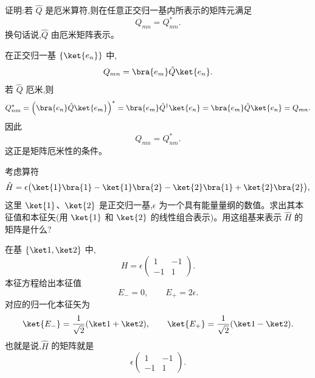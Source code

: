 \begin{question}
证明:若 $\hat Q$ 是厄米算符,则在任意正交归一基内所表示的矩阵元满足
\[
Q_{mn}=Q_{nm}^*.
\]
换句话说,$\hat Q$ 由厄米矩阵表示。
\begin{solution}
在正交归一基 $\{\ket{e_n}\}$ 中,
\[
Q_{mn}=\bra{e_m}\hat Q\ket{e_n}.
\]
若 $\hat Q$ 厄米,则
\[
Q_{nm}^*=\left(\bra{e_n}\hat Q\ket{e_m}\right)^*
=\bra{e_m}\hat Q^\dagger\ket{e_n}
=\bra{e_m}\hat Q\ket{e_n}=Q_{mn}.
\]
因此
\[
\boxed{Q_{mn}=Q_{nm}^*.}
\]
这正是矩阵厄米性的条件。
\end{solution}
\end{question}

\begin{question}
考虑算符
\[
\hat H=\epsilon\bigl(\ket{1}\bra{1}-\ket{1}\bra{2}-\ket{2}\bra{1}+\ket{2}\bra{2}\bigr),
\]
这里 $\ket{1}$、$\ket{2}$ 是正交归一基,$\epsilon$ 为一个具有能量量纲的数值。求出其本征值和本征矢(用 $\ket{1}$ 和 $\ket{2}$ 的线性组合表示)。用这组基来表示 $\hat H$ 的矩阵是什么?
\begin{solution}
在基 $\{\ket1,\ket2\}$ 中,
\[
H=\epsilon\begin{pmatrix}1&-1\\-1&1\end{pmatrix}.
\]
本征方程给出本征值
\[
E_-=0,
\qquad
E_+=2\epsilon.
\]
对应的归一化本征矢为
\[
\ket{E_-}=\frac1{\sqrt2}(\ket1+\ket2),
\qquad
\ket{E_+}=\frac1{\sqrt2}(\ket1-\ket2).
\]
也就是说,$\hat H$ 的矩阵就是
\[
\boxed{\epsilon\begin{pmatrix}1&-1\\-1&1\end{pmatrix}.}
\]
\end{solution}
\end{question}

